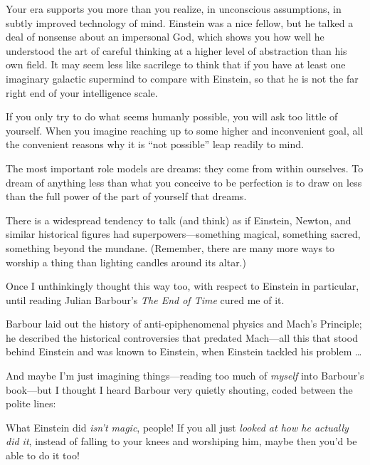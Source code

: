 {
 Your era supports you more than you realize, in unconscious
assumptions, in subtly improved technology of mind. Einstein was a nice
fellow, but he talked a deal of nonsense about an impersonal God, which
shows you how well he understood the art of careful thinking at a
higher level of abstraction than his own field. It may seem less like
sacrilege to think that if you have at least one imaginary galactic
supermind to compare with Einstein, so that he is not the far right end
of your intelligence scale.}

{
 If you only try to do what seems humanly possible, you will ask
too little of yourself. When you imagine reaching up to some higher and
inconvenient goal, all the convenient reasons why it is
``not possible'' leap readily to
mind.}

{
 The most important role models are dreams: they come from within
ourselves. To dream of anything less than what you conceive to be
perfection is to draw on less than the full power of the part of
yourself that dreams.}

\myendsectiontext


{
 There is a widespread tendency to talk (and think) as if Einstein,
Newton, and similar historical figures had superpowers---something
magical, something sacred, something beyond the mundane. (Remember,
there are many more ways to worship a thing than lighting candles
around its altar.) }

{
 Once I unthinkingly thought this way too, with respect to Einstein
in particular, until reading Julian Barbour's
\textit{The End of Time} cured me of it.}

{
 Barbour laid out the history of anti-epiphenomenal physics and
Mach's Principle; he described the historical
controversies that predated Mach---all this that stood behind Einstein
and was known to Einstein, when Einstein tackled his problem \ldots}

{
 And maybe I'm just imagining things---reading too
much of \textit{myself} into Barbour's book---but I
thought I heard Barbour very quietly shouting, coded between the polite
lines:}

{
 What Einstein did \textit{isn't magic}, people! If
you all just \textit{looked at how he actually did it}, instead of
falling to your knees and worshiping him, maybe then
you'd be able to do it too!}

